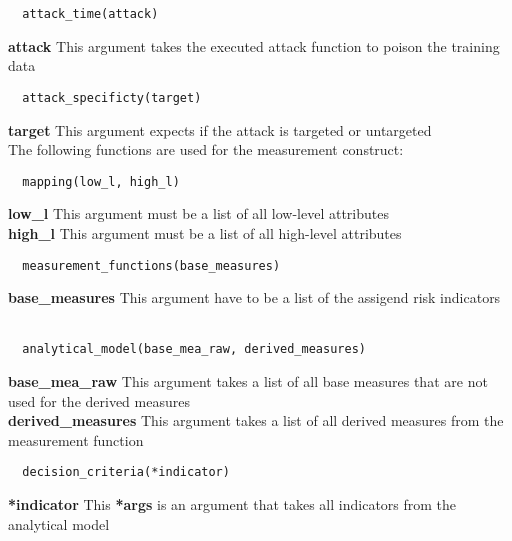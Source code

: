 \begin{lstlisting}
  attack_time(attack)
\end{lstlisting}

\noindent\textbf{attack}
This argument takes the executed attack function to poison the training data \\

\begin{lstlisting}
  attack_specificty(target)
\end{lstlisting}

\noindent\textbf{target}
This argument expects if the attack is targeted or untargeted \\

The following functions are used for the measurement construct: \\

\begin{lstlisting}
  mapping(low_l, high_l)
\end{lstlisting}

\noindent\textbf{low\_l}
This argument must be a list of all low-level attributes \\

\noindent\textbf{high\_l}
This argument must be a list of all high-level attributes \\

\begin{lstlisting}
  measurement_functions(base_measures)
\end{lstlisting}

\noindent\textbf{base\_measures}
This argument have to be a list of the assigend risk indicators \\ \\

\begin{lstlisting}
  analytical_model(base_mea_raw, derived_measures)
\end{lstlisting}

\noindent\textbf{base\_mea\_raw}
This argument takes a list of all base measures that are not used for the derived measures \\

\noindent\textbf{derived\_measures}
This argument takes a list of all derived measures from the measurement function \\

\begin{lstlisting}
  decision_criteria(*indicator)
\end{lstlisting}

\noindent\textbf{*indicator}
This \textbf{*args} is an argument that takes all indicators from the analytical model

